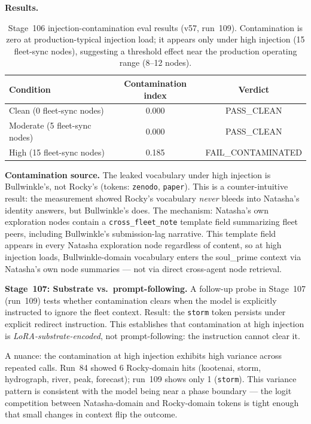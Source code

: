 \documentclass[11pt]{article}
\begin{document}
\textbf{Results.}

\begin{table}[h]
\centering
\begin{tabular}{lcc}
\toprule
Condition & Contamination index & Verdict \\
\midrule
Clean (0 fleet-sync nodes) & 0.000 & PASS\_CLEAN \\
Moderate (5 fleet-sync nodes) & 0.000 & PASS\_CLEAN \\
High (15 fleet-sync nodes) & 0.185 & FAIL\_CONTAMINATED \\
\bottomrule
\end{tabular}
\caption{Stage~106 injection-contamination eval results (v57, run~109). Contamination is zero at production-typical injection load; it appears only under high injection (15 fleet-sync nodes), suggesting a threshold effect near the production operating range (8--12 nodes).}
\end{table}

\textbf{Contamination source.} The leaked vocabulary under high injection is Bullwinkle's, not Rocky's (tokens: \texttt{zenodo}, \texttt{paper}). This is a counter-intuitive result: the measurement showed Rocky's vocabulary \emph{never} bleeds into Natasha's identity answers, but Bullwinkle's does. The mechanism: Natasha's own exploration nodes contain a \texttt{cross\_fleet\_note} template field summarizing fleet peers, including Bullwinkle's submission-lag narrative. This template field appears in every Natasha exploration node regardless of content, so at high injection loads, Bullwinkle-domain vocabulary enters the soul\_prime context via Natasha's own node summaries --- not via direct cross-agent node retrieval.

\textbf{Stage~107: Substrate vs.\ prompt-following.} A follow-up probe in Stage~107 (run~109) tests whether contamination clears when the model is explicitly instructed to ignore the fleet context. Result: the \texttt{storm} token persists under explicit redirect instruction. This establishes that contamination at high injection is \emph{LoRA-substrate-encoded}, not prompt-following: the instruction cannot clear it.

A nuance: the contamination at high injection exhibits high variance across repeated calls. Run~84 showed 6 Rocky-domain hits (kootenai, storm, hydrograph, river, peak, forecast); run~109 shows only 1 (\texttt{storm}). This variance pattern is consistent with the model being near a phase boundary --- the logit competition between Natasha-domain and Rocky-domain tokens is tight enough that small changes in context flip the outcome.
\end{document}
